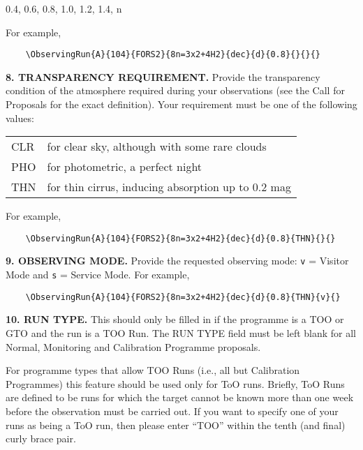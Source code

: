 \documentclass{article}
\begin{document}
\smallskip

0.4, 0.6, 0.8, 1.0, 1.2, 1.4, n

\smallskip

For example,
\begin{verbatim}
    \ObservingRun{A}{104}{FORS2}{8n=3x2+4H2}{dec}{d}{0.8}{}{}{}
\end{verbatim}

\medskip

{\bf 8. TRANSPARENCY REQUIREMENT.} Provide the transparency
condition of the atmosphere required during your observations (see the
Call for Proposals for the exact definition). Your requirement must
be one of the following values:

\smallskip

\begin{tabular}{ll}
  CLR & for clear sky, although with some rare clouds \\
  PHO & for photometric, a perfect night \\
  THN & for thin cirrus, inducing absorption up to 0.2 mag \\
\end{tabular}

\smallskip

For example, 
\begin{verbatim}
    \ObservingRun{A}{104}{FORS2}{8n=3x2+4H2}{dec}{d}{0.8}{THN}{}{}
\end{verbatim}

\medskip

{\bf 9. OBSERVING MODE.} Provide the requested observing mode:
\verb|v| = Visitor Mode and \verb|s| = Service Mode. For example,
\begin{verbatim}
    \ObservingRun{A}{104}{FORS2}{8n=3x2+4H2}{dec}{d}{0.8}{THN}{v}{}
\end{verbatim}

{\bf 10. RUN TYPE.}
This should only be filled in if the programme is a TOO or GTO 
and the run is a TOO Run.  The RUN TYPE field must be left blank 
for all Normal, Monitoring and Calibration Programme proposals.

For programme types that allow TOO Runs (i.e., all but Calibration Programmes) this feature should be used only for ToO runs.
Briefly, ToO Runs are defined to be runs for which the target cannot be known more than
one week before the observation must be carried out.
If you want to specify one of your runs 
as being a ToO run, then please enter ``TOO'' within the tenth (and final) curly brace pair.
\end{document}
